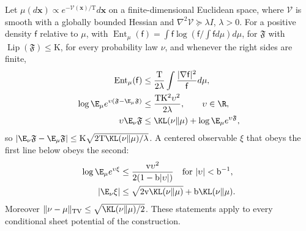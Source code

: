 Let \(\mu(d\mathbf x)\propto e^{-\mathcal V(\mathbf x)/\mathrm T}d\mathbf x\) on
a finite-dimensional Euclidean space, where \(\mathcal V\) is smooth with a
globally bounded Hessian and \(\nabla^2\mathcal V\succeq\lambda I\),
\(\lambda>0\). For a positive density \(\mathsf f\) relative to \(\mu\), with
\(\operatorname{Ent}_\mu(\mathsf f)=\int\mathsf f\log(\mathsf f/\int\mathsf f d\mu) d\mu\),
for \(\mathfrak F\) with \(\operatorname{Lip}(\mathfrak F)\le\mathrm K\), for
every probability law \(\nu\), and whenever the right sides are finite,
\begin{align}
 \operatorname{Ent}_\mu(\mathsf f)
 &\le \frac{\mathrm T}{2\lambda}
           \int\frac{|\nabla\mathsf f|^2}{\mathsf f} d\mu,
 \label{eq:rg-formation-continuous-lsi}\\
 \log\E_\mu e^{\upsilon(\mathfrak F-\E_\mu\mathfrak F)}
 &\le\frac{\mathrm T\mathrm K^2\upsilon^2}{2\lambda},
 \qquad \upsilon\in\R,
 \label{eq:rg-formation-herbst-proof}\\
 \upsilon\E_\nu\mathfrak F&\le\KL(\nu\Vert\mu)+\log\E_\mu e^{\upsilon\mathfrak F},
 \label{eq:rg-formation-entropy-duality}
\end{align}
so \(|\E_\nu\mathfrak F-\E_\mu\mathfrak F|\le\mathrm K\sqrt{2\mathrm T\KL(\nu\Vert\mu)/\lambda}\).
A centered observable \(\xi\) that obeys the first line below obeys the second:
\begin{align}
 \log\E_\mu e^{\upsilon\xi}&\le
       \frac{\mathrm v\upsilon^2}{2(1-\mathrm b|\upsilon|)}\quad\text{for } |\upsilon|<\mathrm b^{-1},
 \label{eq:rg-formation-subgamma-proof}\\
 |\E_\nu\xi|
 &\le\sqrt{2\mathrm v\KL(\nu\Vert\mu)}+\mathrm b\KL(\nu\Vert\mu).
 \label{eq:rg-formation-score-duality}
\end{align}
Moreover \(\|\nu-\mu\|_{\mathrm{TV}}\le\sqrt{\KL(\nu\Vert\mu)/2}\). These
statements apply to every conditional sheet potential of the construction.

